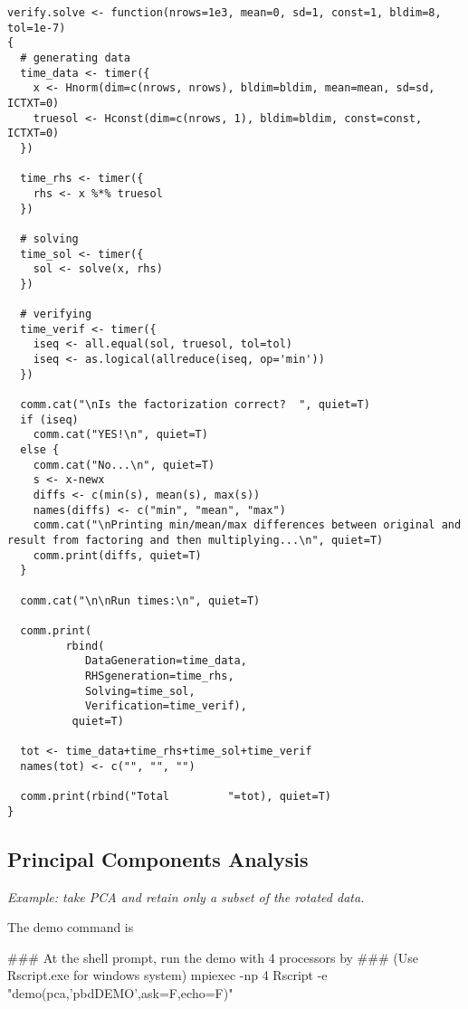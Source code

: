 \begin{lstlisting}[language=rr,title=Verifying Distributed System Solving]
verify.solve <- function(nrows=1e3, mean=0, sd=1, const=1, bldim=8, tol=1e-7)
{
  # generating data
  time_data <- timer({
    x <- Hnorm(dim=c(nrows, nrows), bldim=bldim, mean=mean, sd=sd, ICTXT=0)
    truesol <- Hconst(dim=c(nrows, 1), bldim=bldim, const=const, ICTXT=0)
  })
  
  time_rhs <- timer({
    rhs <- x %*% truesol
  })

  # solving
  time_sol <- timer({
    sol <- solve(x, rhs)
  })
  
  # verifying
  time_verif <- timer({
    iseq <- all.equal(sol, truesol, tol=tol)
    iseq <- as.logical(allreduce(iseq, op='min'))
  })
  
  comm.cat("\nIs the factorization correct?  ", quiet=T)
  if (iseq)
    comm.cat("YES!\n", quiet=T)
  else {
    comm.cat("No...\n", quiet=T)
    s <- x-newx
    diffs <- c(min(s), mean(s), max(s))
    names(diffs) <- c("min", "mean", "max")
    comm.cat("\nPrinting min/mean/max differences between original and result from factoring and then multiplying...\n", quiet=T)
    comm.print(diffs, quiet=T)
  }
  
  comm.cat("\n\nRun times:\n", quiet=T)
  
  comm.print( 
         rbind(
            DataGeneration=time_data, 
            RHSgeneration=time_rhs,
            Solving=time_sol, 
            Verification=time_verif),
          quiet=T)
  
  tot <- time_data+time_rhs+time_sol+time_verif
  names(tot) <- c("", "", "")
  
  comm.print(rbind("Total         "=tot), quiet=T)
}
\end{lstlisting}








\subsection{Principal Components Analysis}

\emph{Example:  take PCA and retain only a subset of the rotated data.}

The demo command is
\begin{Command}
### At the shell prompt, run the demo with 4 processors by
### (Use Rscript.exe for windows system)
mpiexec -np 4 Rscript -e "demo(pca,'pbdDEMO',ask=F,echo=F)"
\end{Command}

